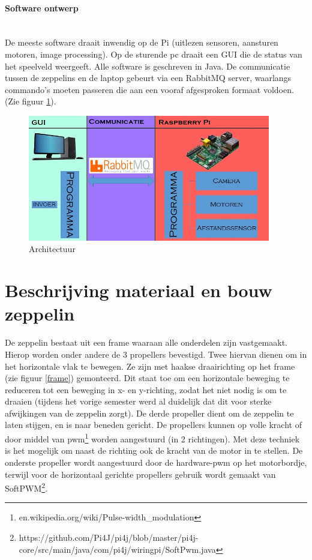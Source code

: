 \documentclass[tt]{penoverslag}
\begin{document}
\paragraph{Software ontwerp}
~\\
De meeste software draait inwendig op de Pi (uitlezen sensoren, aansturen motoren, image processing). Op de sturende pc draait een GUI die de status van het speelveld weergeeft. Alle software is geschreven in Java. De communicatie tussen de zeppelins en de laptop gebeurt via een RabbitMQ server, waarlangs commando's moeten passeren die aan een vooraf afgesproken formaat voldoen. (Zie figuur \ref{schema}). \\

\begin{figure}[ht!]
\centering
\includegraphics[height=55mm]{Schema.jpg}
\caption{Architectuur}
\label{schema}
\end{figure}

\section{Beschrijving materiaal en bouw zeppelin}
De zeppelin bestaat uit een frame waaraan alle onderdelen zijn vastgemaakt. Hierop worden onder andere de 3 propellers bevestigd. Twee hiervan dienen om in het horizontale vlak te bewegen. Ze zijn met haakse draairichting op het frame (zie figuur \ref{frame}) gemonteerd. Dit staat toe om een horizontale beweging te reduceren tot een beweging in x- en y-richting, zodat het niet nodig is om te draaien (tijdens het vorige semester werd al duidelijk dat dit voor sterke afwijkingen van de zeppelin zorgt). De derde propeller dient om de zeppelin te laten stijgen, en is naar beneden gericht. De propellers kunnen op volle kracht of door middel van pwm\footnote{en.wikipedia.org/wiki/Pulse-width\_modulation} worden aangestuurd (in 2 richtingen). Met deze techniek is het mogelijk om naast de richting ook de kracht van de motor in te stellen. De onderste propeller wordt aangestuurd door de hardware-pwm op het motorbordje, terwijl voor de horizontaal gerichte propellers gebruik wordt gemaakt van SoftPWM\footnote{https://github.com/Pi4J/pi4j/blob/master/pi4j-core/src/main/java/com/pi4j/wiringpi/SoftPwm.java}. ~\\
\end{document}
